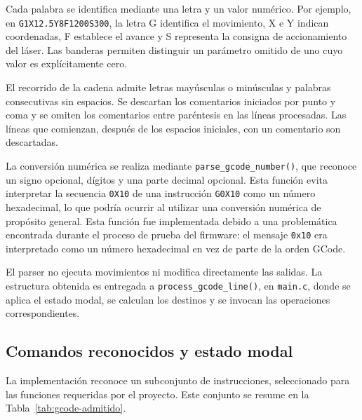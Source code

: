 \documentclass[blue,fullpaper]{ludusofficial}  %
\begin{document}
Cada palabra se identifica mediante una letra y
un valor numérico. Por ejemplo, en
\texttt{G1X12.5Y8F1200S300}, la letra G identifica
el movimiento, X e Y indican coordenadas, F establece
el avance y S representa la consigna de accionamiento
del láser. Las banderas permiten distinguir un parámetro
omitido de uno cuyo valor es explícitamente cero.

El recorrido de la cadena admite letras mayúsculas
o minúsculas y palabras consecutivas sin espacios.
Se descartan los comentarios iniciados por punto
y coma y se omiten los comentarios entre paréntesis
en las líneas procesadas. Las líneas que comienzan,
después de los espacios iniciales, con un comentario
son descartadas.

La conversión numérica se realiza mediante
\texttt{parse\_gcode\_number()}, que reconoce un signo
opcional, dígitos y una parte decimal opcional.
Esta función evita interpretar la secuencia
\texttt{0X10} de una instrucción \texttt{G0X10}
como un número hexadecimal, lo que podría ocurrir
al utilizar una conversión numérica de propósito
general. Esta función fue implementada debido a una problemática
encontrada durante el proceso de prueba del firmware: el mensaje
\texttt{0x10} era interpretado como un número hexadecimal en vez de parte
de la orden GCode.

El parser no ejecuta movimientos ni modifica directamente
las salidas. La estructura obtenida es entregada a
\texttt{process\_gcode\_line()}, en \texttt{main.c},
donde se aplica el estado modal, se calculan los destinos
y se invocan las operaciones correspondientes.

\subsection{Comandos reconocidos y estado modal}

La implementación reconoce un subconjunto de instrucciones,
seleccionado para las funciones requeridas por el proyecto.
Este conjunto se resume en la Tabla~\ref{tab:gcode-admitido}.
\end{document}
